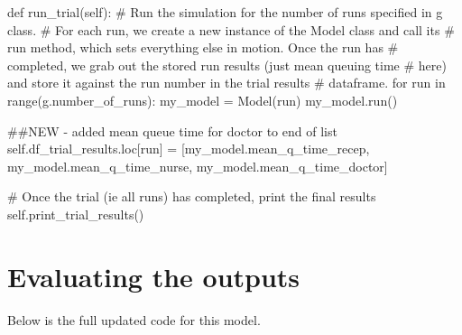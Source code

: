 \documentclass[
  letterpaper,
  DIV=11,
  numbers=noendperiod]{scrreprt}
\newenvironment{Shaded}{\begin{snugshade}}{\end{snugshade}}
\newcommand{\BuiltInTok}[1]{\textcolor[rgb]{0.00,0.23,0.31}{#1}}
\newcommand{\CommentTok}[1]{\textcolor[rgb]{0.37,0.37,0.37}{#1}}
\newcommand{\ControlFlowTok}[1]{\textcolor[rgb]{0.00,0.23,0.31}{#1}}
\newcommand{\KeywordTok}[1]{\textcolor[rgb]{0.00,0.23,0.31}{#1}}
\newcommand{\NormalTok}[1]{\textcolor[rgb]{0.00,0.23,0.31}{#1}}
\newcommand{\OperatorTok}[1]{\textcolor[rgb]{0.37,0.37,0.37}{#1}}
\newcommand{\VariableTok}[1]{\textcolor[rgb]{0.07,0.07,0.07}{#1}}
\begin{document}
\begin{Shaded}
\begin{Highlighting}[]
  \KeywordTok{def}\NormalTok{ run\_trial(}\VariableTok{self}\NormalTok{):}
      \CommentTok{\# Run the simulation for the number of runs specified in g class.}
      \CommentTok{\# For each run, we create a new instance of the Model class and call its}
      \CommentTok{\# run method, which sets everything else in motion.  Once the run has}
      \CommentTok{\# completed, we grab out the stored run results (just mean queuing time}
      \CommentTok{\# here) and store it against the run number in the trial results}
      \CommentTok{\# dataframe.}
      \ControlFlowTok{for}\NormalTok{ run }\KeywordTok{in} \BuiltInTok{range}\NormalTok{(g.number\_of\_runs):}
\NormalTok{          my\_model }\OperatorTok{=}\NormalTok{ Model(run)}
\NormalTok{          my\_model.run()}

          \CommentTok{\#\#NEW {-} added mean queue time for doctor to end of list}
          \VariableTok{self}\NormalTok{.df\_trial\_results.loc[run] }\OperatorTok{=}\NormalTok{ [my\_model.mean\_q\_time\_recep,}
\NormalTok{                                            my\_model.mean\_q\_time\_nurse,}
\NormalTok{                                            my\_model.mean\_q\_time\_doctor]}

      \CommentTok{\# Once the trial (ie all runs) has completed, print the final results}
      \VariableTok{self}\NormalTok{.print\_trial\_results()}
\end{Highlighting}
\end{Shaded}

\section{Evaluating the outputs}\label{evaluating-the-outputs-1}

Below is the full updated code for this model.
\end{document}
